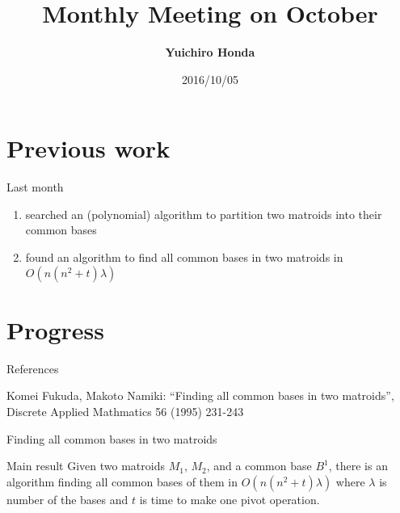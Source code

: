 \documentclass[11pt,xcolor=dvipsnames,table,dvipdfmx]{beamer}
\title{Monthly Meeting on October}
\author{\textbf{Yuichiro Honda}}
\date{2016/10/05}
\institute{Morita lab. M1}
\begin{document}
\maketitle

\section{Previous work}
\begin{frame}{Last month}
 \begin{enumerate}
  \item searched an (polynomial) algorithm to partition two matroids into their common bases
  \item found an algorithm to find all common bases in two matroids in $O(n(n^2+t)\lambda)$
 \end{enumerate}
\end{frame}



\section{Progress}
\begin{frame}{References}
 \begin{thebibliography}{9}
	\small{Komei Fukuda, Makoto Namiki: ``Finding all common bases in two matroids'', Discrete Applied Mathmatics 56 (1995) 231-243}
 \end{thebibliography}
\end{frame}

\begin{frame}{Finding all common bases in two matroids}
 \begin{block}{Main result}
  Given two matroids $M_1$, $M_2$, and a common base $B^1$, there is an algorithm finding all common bases of them in \alert{$O(n(n^2+t)\lambda)$ }where $\lambda$ is number of the bases and $t$ is time to make one pivot operation.
 \end{block}
\end{frame}
\end{document}

